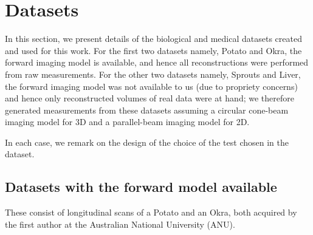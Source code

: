 \documentclass[journal]{IEEEtran}
\begin{document}
\section{Datasets}
\label{sec:datasets}
In this section, we present details of the biological and medical
datasets created and used for this work. For the first two datasets
namely, Potato and Okra, the forward imaging model is available, and
hence all reconstructions were performed from raw measurements. For
the other two datasets namely, Sprouts and Liver, the forward imaging
model was not available to us (due to propriety concerns) and hence
only reconstructed volumes of real data were at hand; we therefore
generated measurements from these datasets assuming a circular
cone-beam imaging model for 3D and a parallel-beam imaging model for
2D.

In each case, we remark on the design of the choice of the test chosen
in the dataset.

\subsection{Datasets with the forward model available}
\label{sec:potatoAndOkra}

These consist of longitudinal scans of a Potato and an Okra, both
acquired by the first author at the Australian National University
(ANU). 
\end{document}
